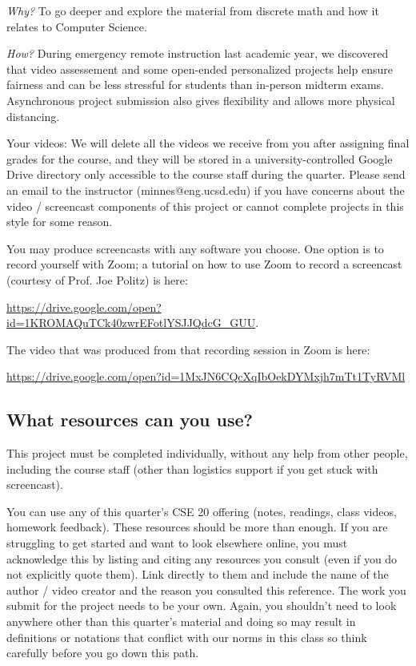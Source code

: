 {\it Why?}
To go deeper and explore the material from discrete math and how it relates to Computer Science.

{\it How?} During emergency remote instruction last academic year, we discovered
that video assessement and some open-ended personalized projects help ensure fairness
and can be less stressful for students than in-person midterm exams. Asynchronous project
submission also gives flexibility and allows more physical distancing.

Your videos: We will delete all the videos we receive from you after assigning final grades for the course, 
and they will be stored in a university-controlled Google Drive directory 
only accessible to the course staff during the quarter. 
Please send an email to the instructor (minnes@eng.ucsd.edu) if you have 
concerns about 
the video / screencast components of this project or cannot complete projects in this style for some reason.

You may produce screencasts with any software you choose. 
One option is to record yourself with Zoom; a tutorial on how to use Zoom to record a 
screencast (courtesy of Prof. Joe Politz)  is here: 

\url{https://drive.google.com/open?id=1KROMAQuTCk40zwrEFotlYSJJQdcG_GUU}.

The video that was produced from that recording session in Zoom is here:

\url{https://drive.google.com/open?id=1MxJN6CQcXqIbOekDYMxjh7mTt1TyRVMl}

\subsection*{What resources can you use?}
This project must be completed individually, without any help from other people, 
including the course staff (other than logistics support if you get stuck with screencast). 

You can use any of this quarter's CSE 20 offering (notes, readings, class videos, homework feedback). 
These resources should be more than enough. If you are struggling to get started and want to 
look elsewhere online, you must acknowledge this by listing and citing any resources you consult 
(even if you do not explicitly quote them). Link directly to them and include the name of the 
author / video creator and the reason you consulted this reference. The work you submit for 
the project needs to be your own. Again, you shouldn't need to look anywhere other 
than this quarter's material and doing so may result in definitions or notations 
that conflict with our norms in this class so think carefully before you go down this path.

